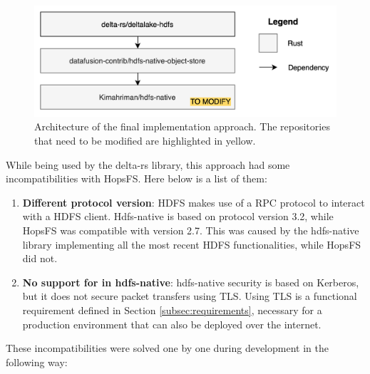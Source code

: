 \begin{figure}[!ht]
  \begin{center}
    \includegraphics[width=\textwidth]{figures/4-implementation/hdfs-native.png}
  \caption[Final solution architecture]{Architecture of the final implementation approach. The repositories that need to be modified are highlighted in yellow.}
  \label{fig:approach_2_solution_schema}
  \end{center}
\end{figure}
While being used by the delta-rs library, this approach had some incompatibilities with \gls{HopsFS}. Here below is a list of them:
\begin{enumerate}
  \item \textbf{Different  protocol version}: \gls{HDFS} makes use of a \gls{RPC} protocol to interact with a \gls{HDFS} client. Hdfs-native is based on protocol version 3.2, while \gls{HopsFS} was compatible with version 2.7. This was caused by the hdfs-native library implementing all the most recent \gls{HDFS} functionalities, while \gls{HopsFS} did not. 
  \item \textbf{No support for  in hdfs-native}: hdfs-native security is based on Kerberos, but it does not secure packet transfers using \gls{TLS}. Using \gls{TLS} is a functional requirement defined in Section \ref{subsec:requirements}, necessary for a production environment that can also be deployed over the internet.
\end{enumerate}
These incompatibilities were solved one by one during development in the following way:
